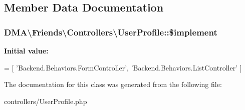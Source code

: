\subsection{Member Data Documentation}
\hypertarget{classDMA_1_1Friends_1_1Controllers_1_1UserProfile_aa1a2c22e3663622a57612b583505c97e}{}
\subsubsection[{\$implement}]{\setlength{\rightskip}{0pt plus 5cm}D\+M\+A\textbackslash{}\+Friends\textbackslash{}\+Controllers\textbackslash{}\+User\+Profile\+::\$implement}\label{classDMA_1_1Friends_1_1Controllers_1_1UserProfile_aa1a2c22e3663622a57612b583505c97e}
{\bfseries Initial value\+:}
\begin{DoxyCode}
= [
        \textcolor{stringliteral}{'Backend.Behaviors.FormController'},
        \textcolor{stringliteral}{'Backend.Behaviors.ListController'}
    ]
\end{DoxyCode}


The documentation for this class was generated from the following file\+:\begin{DoxyCompactItemize}
\item 
controllers/User\+Profile.\+php\end{DoxyCompactItemize}
